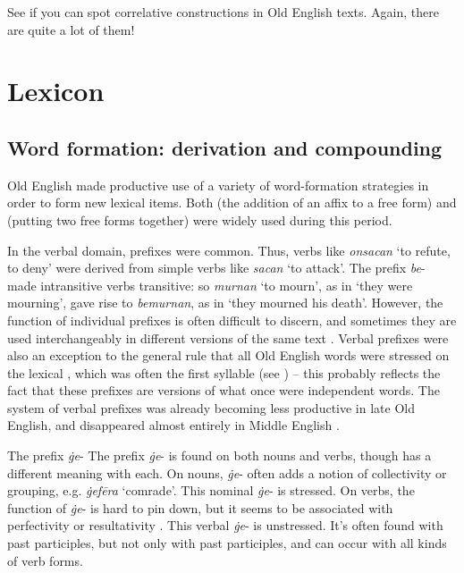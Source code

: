 \noindent See if you can spot correlative constructions in Old English texts. Again, there are quite a lot of them!


\section{Lexicon}\label{OE-lexicon}

\subsection{Word formation: derivation and compounding}\label{OE-wordformation}

Old English made productive use of a variety of word-formation strategies in order to form new lexical items. Both  (the addition of an affix to a free form) and  (putting two free forms together) were widely used during this period.

In the verbal domain, prefixes were common. Thus, verbs like \emph{onsacan} `to refute, to deny' were derived from simple verbs like \emph{sacan} `to attack'. The prefix \emph{be}- made intransitive verbs transitive: so \emph{murnan} `to mourn', as in `they were mourning', gave rise to \emph{bemurnan}, as in `they mourned his death'. However, the function of individual prefixes is often difficult to discern, and sometimes they are used interchangeably in different versions of the same text \citep{Ogura1995}. Verbal prefixes were also an exception to the general rule that all Old English words were stressed on the lexical , which was often the first syllable (see ) -- this probably reflects the fact that these prefixes are  versions of what once were independent words. The system of verbal prefixes was already becoming less productive in late Old English, and disappeared almost entirely in Middle English \citep{Hiltunen1983,Lutz1997,Elenbaas2007,Thim2012}.


\begin{miscbox}{The prefix \emph{ġe}-}
The prefix \emph{ġe}- is found on both nouns and verbs, though has a different meaning with each. On nouns, \emph{ġe}- often adds a notion of collectivity or grouping, e.g. \emph{ġefēra} `comrade'. This nominal \emph{ġe}- is stressed. On verbs, the function of \emph{ġe}- is hard to pin down, but it seems to be associated with perfectivity or resultativity \citep{McFadden2015}. This verbal \emph{ġe}- is unstressed. It's often found with past participles, but not only with past participles, and can occur with all kinds of verb forms.
\end{miscbox}


